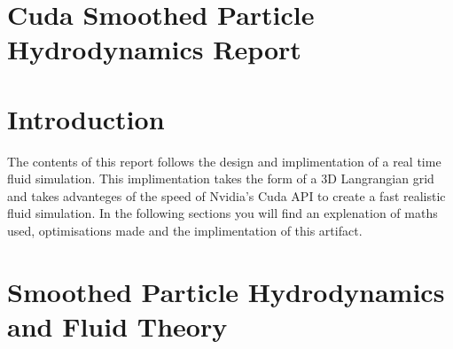 \section*{Cuda Smoothed Particle Hydrodynamics Report }

 \section*{Introduction }

The contents of this report follows the design and implimentation of a real time fluid simulation. This implimentation takes the form of a 3\-D Langrangian grid and takes advanteges of the speed of Nvidia's Cuda A\-P\-I to create a fast realistic fluid simulation. In the following sections you will find an explenation of maths used, optimisations made and the implimentation of this artifact.

\section*{Smoothed Particle Hydrodynamics and Fluid Theory }

